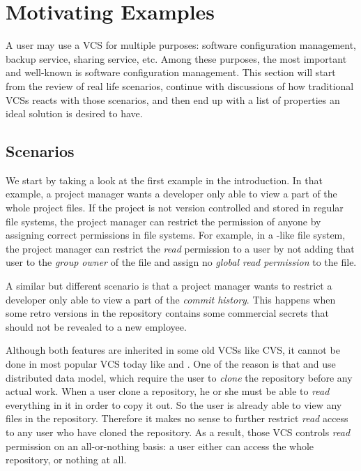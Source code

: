 \section{Motivating Examples}
\label{s:motivation}

A user may use a VCS for multiple purposes: software configuration management,
backup service, sharing service, etc.
Among these purposes, the most important and well-known is software
configuration management. This section will start from the review of
 real life scenarios, continue with discussions of how traditional
VCSs reacts with those scenarios, and then end up with a list of properties an
ideal solution is desired to have.


\subsection{Scenarios}


We start by taking a look at the first example in the introduction. 
In that example, a project manager wants a developer only able to view a part of
the whole project files. If the project is not version controlled and stored in
regular file systems, the project manager can restrict the permission of anyone
by assigning correct permissions in file systems. For example, in a \unix-like
file system, the project manager can restrict the \emph{read} permission to a user
by not adding that user to the \emph{group owner} of the file and assign no
\emph{global read permission} to the file.

A similar but different scenario is that a project manager wants to restrict a
developer only able to view a part of the \emph{commit history}. This happens
when some retro versions in the repository contains some commercial secrets that
should not be revealed to a new employee.

Although both features are inherited in some old VCSs like CVS\cite{cvs}, it cannot
be done in most popular VCS today like \git\cite{git} and
\mercurial\cite{mercurial}. One of the reason is that \git and \mercurial use distributed data
model, which require the user to \emph{clone} the repository before any actual
work. When a user clone a repository, he or she must be able to \emph{read}
everything in it in order to copy it out. So the user is already able to view
any files in the repository. Therefore it makes no sense to further restrict
\emph{read} access to any user who have cloned the repository. As a result,
those VCS controls \emph{read} permission on an all-or-nothing basis: a user
either can access the whole repository, or nothing at all.

